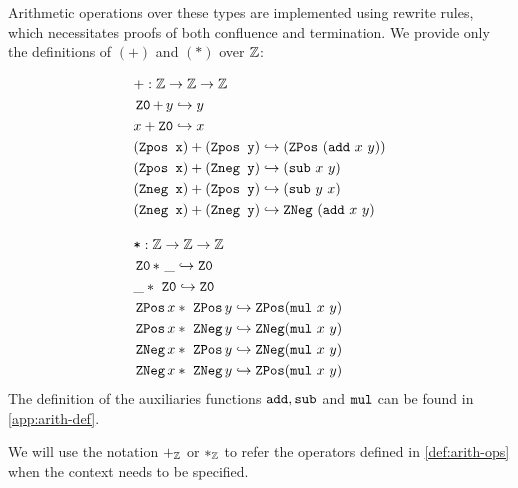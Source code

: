 \begin{definition}[$\Z$ operators]\label{def:arith-ops}
Arithmetic operations over these types are implemented using rewrite rules, which necessitates proofs of both confluence and termination.
We provide only the definitions of $(+)$ and $(*)$ over $\Z$:

\begin{align*}
&+: \bb{Z} \ra \bb{Z} \ra \bb{Z} \\
& \ZO +\, y \re y \\
& x + \ZO \re x \\
& (\tt{Zpos x}) + (\tt{Zpos y}) \re (\ZPos~(\tt{add}~x~y))  \\
& (\tt{Zpos x}) + (\tt{Zneg y}) \re (\tt{sub}~x~y)  \\
& (\tt{Zneg x}) + (\tt{Zpos y}) \re (\tt{sub}~y~x)  \\
& (\tt{Zneg x}) + (\tt{Zneg y}) \re \ZNeg~(\tt{add}~x~y)\\[1em]
&\tt{*} : \bb{Z} \ra \bb{Z} \ra \bb{Z} \\
& \ZO *~\_ \re \ZO \\
& \_ *~\ZO \re \ZO \\
& \ZPos x *~\ZPos y \re \ZPos (\tt{mul}~x~y) \\
& \ZPos x *~\ZNeg    y \re \ZNeg    (\tt{mul}~x~y) \\
& \ZNeg    x *~\ZPos y \re \ZNeg    (\tt{mul}~x~y) \\
& \ZNeg    x *~\ZNeg    y \re \ZPos (\tt{mul}~x~y) \\
\end{align*}
The definition of the auxiliaries functions $\kw{add}, \kw{sub}$ and $\kw{mul}$ can be found in \cref{app:arith-def}.
\end{definition}

\begin{notation}
We will use the notation $+_\Z$ or $*_\Z$ to refer the operators defined in \cref{def:arith-ops} when the context needs to be specified.
\end{notation}


